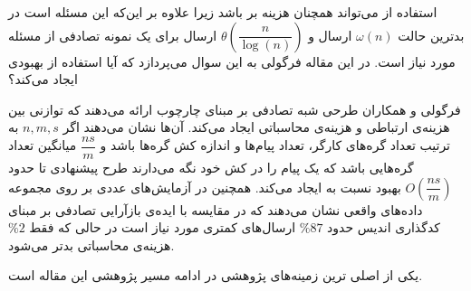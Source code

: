 \begin{enumerate}
استفاده از 
\icod
می‌تواند همچنان هزینه بر باشد زیرا علاوه بر این‌که این مسئله
\nphard
است در بدترین حالت
$\omega(n)$
ارسال و 
$\theta(\dfrac{n}{\log(n)})$
ارسال برای یک نمونه تصادفی از مسئله مورد نیاز است. در این مقاله فرگولی به این سوال می‌پردازد که آیا استفاده از 
\picod
بهبودی ایجاد می‌کند؟

فرگولی و همکاران طرحی شبه تصادفی بر مبنای چارچوب
\picod
ارائه می‌دهند که توازنی بین هزینه‌ی ارتباطی و هزینه‌ی محاسباتی ایجاد می‌کند. آن‌ها نشان می‌دهند اگر
$n, m, s$
به ترتیب تعداد گره‌های کارگر، تعداد پیام‌ها و اندازه کش گره‌ها باشد و
$\dfrac{ns}{m}$
میانگین تعداد گره‌هایی باشد که یک پیام را در کش خود نگه می‌دارند طرح پیشنهادی تا حدود
$O(\dfrac{ns}{m})$
بهبود نسبت به 
\icod
ایجاد می‌کند. همچنین در آزمایش‌های عددی بر روی مجموعه داده‌های واقعی نشان می‌دهند که در مقایسه با ایده‌‌ی بازآرایی تصادفی بر مبنای کدگذاری اندیس حدود
$\%87$
ارسال‌های کمتری مورد نیاز است در حالی که فقط
$\%2$
هزینه‌ی محاسباتی بدتر می‌شود.

یکی از اصلی ترین زمینه‌های پژوهشی در
\picod
ادامه مسیر پژوهشی این مقاله است.
	
\end{enumerate}